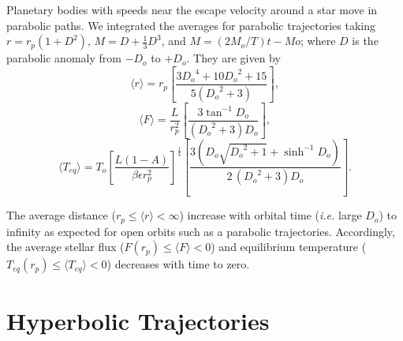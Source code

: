 \documentclass[a4paper,fleqn,usenatbib]{mnras}
\begin{document}
Planetary bodies with speeds near the escape velocity around a star move in parabolic paths. We integrated the averages for parabolic trajectories taking $r=r_p(1+D^2)$, $M=D+\frac{1}{3}D^3$, and $M=(2M_o/T)t-Mo$; where $D$ is the parabolic anomaly from $-D_o$ to $+D_o$. They are given by
\begin{equation} \label{eq:rp}
\langle r \rangle = r_p \left[ \frac{3 {D_o}^{4} + 10 {D_o}^{2} + 15}{5 \left({D_o}^{2} + 3\right)} \right],
\end{equation}
\begin{equation} \label{eq:Fp}
\langle F \rangle = \frac{L}{r_p^2} \left[ \frac{3 \tan^{-1} D_o}{{\left({D_o}^2 + 3\right)} D_o} \right],
\end{equation}
\begin{equation} \label{eq:Tp}
\langle T_{eq} \rangle = T_o \left[\frac{L {\left(1 - A\right)}}{\beta \epsilon r_p^{2}}\right]^{\frac{1}{4}} \left[ \frac{3 {\left(D_o\sqrt{{D_o}^{2} + 1} + \sinh^{-1} D_o \right)}}{2 \, {\left({D_o}^{2} + 3\right)} D_o} \right].
\end{equation}


The average distance ($r_p \leq \langle r \rangle < \infty$) increase with orbital time (\emph{i.e.} large $D_o$) to infinity as expected for open orbits such as a parabolic trajectories. Accordingly, the average stellar flux ($F(r_p) \leq \langle F \rangle < 0$) and equilibrium temperature ($T_{eq}(r_p) \leq \langle T_{eq} \rangle < 0$) decreases with time to zero.


\section{Hyperbolic Trajectories}
\label{sec:hyperbolic}

\end{document}
